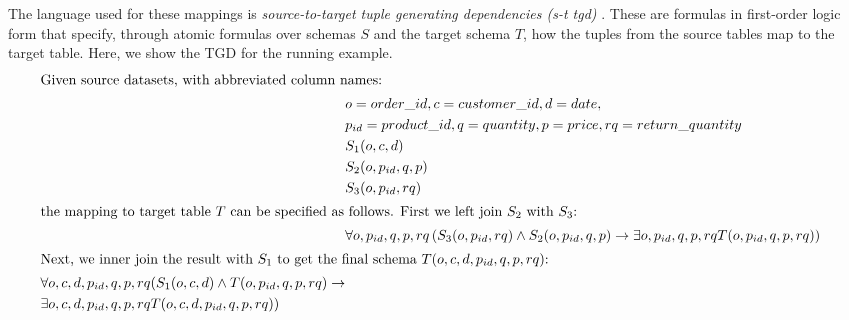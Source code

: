The language used for these mappings is \textit{source-to-target tuple generating dependencies (s-t tgd)} \cite{tgds-Fagin2009}. These are formulas in first-order logic form that specify, through atomic formulas over schemas $S$ and the target schema $T$, how the tuples from the source tables map to the target table. Here, we show the TGD for the running example.\begin{alignat*}{2}
    \intertext{Given source datasets, with abbreviated column names:}
     & o=order\_id, c=customer\_id, d=date,                                                                                                                      \\
     & p_{id}=product\_id, q=quantity, p=price, rq=return\_quantity                                                                                              \\
     & S_1(o, c, d)                                                                                                                                              \\
     & S_2(o, p_{id} , q,  p)                                                                                                                                    \\
     & S_3(o, p_{id}, rq)                                                                                                                                      & \\
    \intertext{the mapping to target table $T$ can be specified as follows. First we left join $S_2$ with $S_3$:}
     & \forall o, p_{id}, q, p, rq \left( S_3(o, p_{id}, rq) \land S_2(o, p_{id}, q, p) \rightarrow \exists o, p_{id}, q, p, rq T(o, p_{id}, q, p, rq) \right)   \\
    \intertext{Next, we inner join the result with $S_1$ to get the final schema $T(o, c, d, p_{id}, q, p, rq)$:} \begin{split}
                                                                                                                      & \forall o, c, d, p_{id}, q, p, rq ( S_1(o, c, d) \land T(o, p_{id}, q, p, rq) \rightarrow \\
                                                                                                                      & \exists o, c, d, p_{id}, q, p, rq T(o, c, d, p_{id}, q, p, rq) )
                                                                                                                  \end{split}
\end{alignat*}

